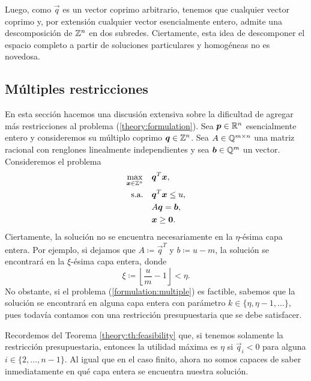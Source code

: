 Luego, como $\vec{q}$ es un vector coprimo arbitrario, tenemos que cualquier vector coprimo y, por
extensión cualquier vector esencialmente entero, admite una descomposición de $\mathbb{Z}^n$ en dos
subredes. Ciertamente, esta idea de descomponer el espacio completo a partir de soluciones
particulares y homogéneas no es novedosa.

\subsection{Múltiples restricciones}
\noindent
En esta sección hacemos una discusión extensiva sobre la dificultad de agregar más restricciones al
problema (\ref{theory:formulation}). Sea $\boldsymbol{p} \in \mathbb{R}^n$ esencialmente entero y consideremos su
múltiplo coprimo $\boldsymbol{q} \in \mathbb{Z}^n$. Sea $A \in \mathbb{Q}^{m \times n}$ una matriz racional con renglones
linealmente independientes y sea $\boldsymbol{b} \in \mathbb{Q}^m$ un vector. Consideremos el problema
\begin{subequations}
	\label{formulation:multiple}
	\begin{align}
		\max_{\boldsymbol{x} \in \mathbb{Z}^n} \quad
			& \boldsymbol{q}^T\boldsymbol{x}, \label{formulation:multiple:objective} \\
		\text{s.a.} \quad
			& \boldsymbol{q}^T\boldsymbol{x} \leq u, \label{formulation:multiple:constraint:budget} \\
			& A\boldsymbol{q} = \boldsymbol{b}, \label{formulation:multiple:constraints} \\
			& \boldsymbol{x} \geq \boldsymbol{0}. \nonumber
	\end{align}
\end{subequations}
Ciertamente, la solución no se encuentra necesariamente en la $\eta$-ésima capa entera. Por ejemplo,
si dejamos que $A \coloneq \vec{q}^T$ y $b \coloneq u - m$, la solución se encontrará en la
$\xi$-ésima capa entera, donde
\begin{equation*}
	\xi \coloneq \left\lfloor \frac{u}{m} - 1 \right\rfloor < \eta.
\end{equation*}
No obstante, si el problema (\ref{formulation:multiple}) es factible, sabemos que la solución se
encontrará en alguna capa entera con parámetro $k \in \lbrace \eta, \eta - 1, \ldots \rbrace$, pues
todavía contamos con una restricción presupuestaria que se debe satisfacer.
\begin{observation}
	Recordemos del Teorema \ref{theory:th:feasibility} que, si tenemos solamente la restricción
	presupuestaria, entonces la utilidad máxima es $\eta$ si $\vec{q}_i < 0$ para alguna $i \in
	\lbrace 2, \ldots, n - 1\rbrace$. Al igual que en el caso finito, ahora no somos capaces de
	saber inmediatamente en qué capa entera se encuentra nuestra solución.
\end{observation}

